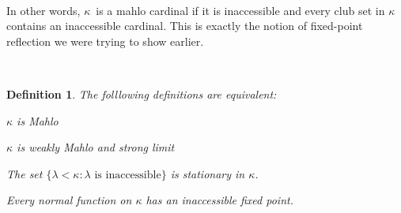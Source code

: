 \documentclass[12pt,a4paper]{article}
\newtheorem{definition}[theorem]{Definition}
\newcommand{\bce}{\begin{compactenum}}
\newcommand{\ece}{\end{compactenum}}
\begin{document}
\

In other words, $\kappa$ is a mahlo cardinal if it is inaccessible and every club set in $\kappa$ contains an inaccessible cardinal. This is exactly the notion of fixed-point reflection we were trying to show earlier.

\

\cite{DrakeBook}
\begin{definition}{}\label{def:mahlo_equivalent}
The folllowing definitions are equivalent:
\bce[(i)]
\item $\kappa$ is Mahlo
\item $\kappa$ is weakly Mahlo and strong limit
\item The set $\{\lambda < \kappa : \lambda\mbox{ is inaccessible}\}$ is stationary in $\kappa$.
\item Every normal function on $\kappa$ has an inaccessible fixed point.
\ece
\end{definition}
\end{document}
